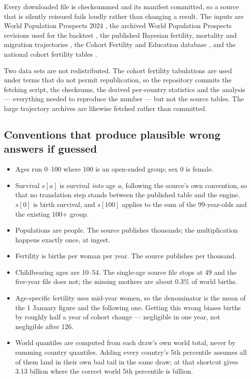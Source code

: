 Every downloaded file is checksummed and its manifest committed, so a source that
is silently reissued fails loudly rather than changing a result. The inputs are
World Population Prospects 2024 \citep{un2024methodology}, the archived World
Population Prospects revisions used for the backtest \citep{unwpparchives}, the
published Bayesian fertility, mortality and migration trajectories
\citep{uw2024downloads,azose2015}, the Cohort Fertility and Education database
\citep{cfe2017}, and the national cohort fertility tables \citep{cdccohort}.

Two data sets are not redistributed. The cohort fertility tabulations are used
under terms that do not permit republication, so the repository commits the
fetching script, the checksums, the derived per-country statistics and the
analysis --- everything needed to reproduce the number --- but not the source
tables. The large trajectory archives are likewise fetched rather than committed.

\subsection*{Conventions that produce plausible wrong answers if guessed}

\begin{itemize}[leftmargin=1.2em]
\item Ages run 0--100 where 100 is an open-ended group; sex 0 is female.
\item Survival $s[a]$ is survival \emph{into} age $a$, following the source's own
convention, so that no translation step stands between the published table and
the engine. $s[0]$ is birth survival, and $s[100]$ applies to the sum of the
99-year-olds and the existing 100+ group.
\item Populations are people. The source publishes thousands; the multiplication
happens exactly once, at ingest.
\item Fertility is births per woman per year. The source publishes per thousand.
\item Childbearing ages are 10--54. The single-age source file stops at 49 and
the five-year file does not; the missing mothers are about 0.3\% of world births.
\item Age-specific fertility uses mid-year women, so the denominator is the mean
of the 1 January figure and the following one. Getting this wrong biases births
by roughly half a year of cohort change --- negligible in one year, not
negligible after 126.
\item World quantiles are computed from each draw's own world total, never by
summing country quantiles. Adding every country's 5th percentile assumes all of
them land in their own bad tail in the same draw; at \ProjectionEndYear{} that
shortcut gives 3.13 billion where the correct world 5th percentile is
\ComparatorTwentyOneFiftyLow{} billion.
\end{itemize}

